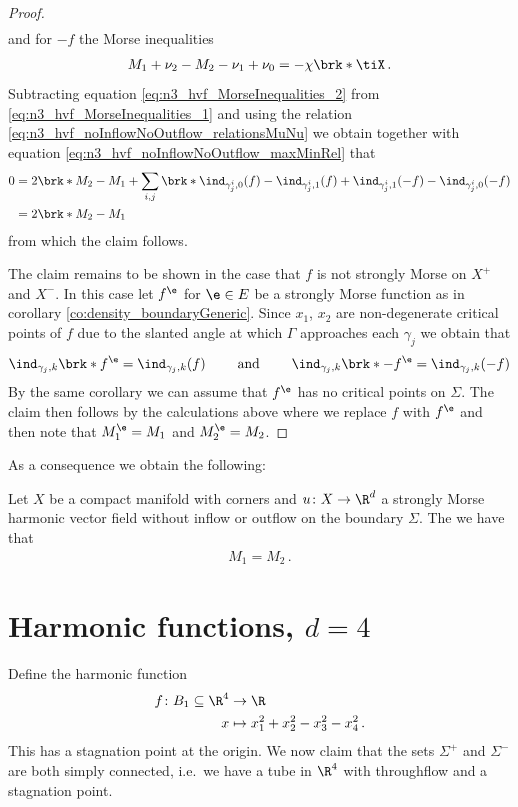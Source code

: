 \begin{proof}
\begin{align}
  \end{align}
  and for $-f$ the Morse inequalities
  \begin{align}
    M_1+\nu_2-M_2-\nu_1+\nu_0=-\chi\brk*{\tiX} \label{eq:n3_hvf_MorseInequalities_2}\,.
  \end{align}
  Subtracting equation \eqref{eq:n3_hvf_MorseInequalities_2} from \eqref{eq:n3_hvf_MorseInequalities_1} and using the relation
  \eqref{eq:n3_hvf_noInflowNoOutflow_relationsMuNu} we obtain
  together with equation \eqref{eq:n3_hvf_noInflowNoOutflow_maxMinRel} that
  \begin{align*}
    0&=2\brk*{M_2-M_1}
    +\sum_{i,j}\brk*{\ind_{\gamma_j^i,0}(f)
    -\ind_{\gamma_j^i,1}(f)
    +\ind_{\gamma_j^i,1}(-f)
    -\ind_{\gamma_j^i,0}(-f)} \\
    &=2\brk*{M_2-M_1}
  \end{align*}
  from which the claim follows.

  The claim remains to be shown in the case that $f$ is not strongly Morse on $X^+$ and $X^-$. In this case let
  $f^\e$ for $\e\in E$ be a strongly Morse function as in corollary \ref{co:density_boundaryGeneric}.
  Since $x_1$, $x_2$ are non-degenerate critical points of $f$
  due to the slanted angle at which
  $\Gamma$ approaches each $\gamma_j$
  we obtain that
  \begin{align}
    \ind_{\gamma_j,k}\brk*{f^\e}=\ind_{\gamma_j,k}(f)\qquad\text{ and }\qquad 
    \ind_{\gamma_j,k}\brk*{-f^\e}=\ind_{\gamma_j,k}(-f)
    \label{eq:n3_hvf_noInflowNoOutflow_morse_indexApprox}
  \end{align}
  By the same corollary we can assume that $f^\e$ has no critical points on
  $\Sigma$.
  The claim then follows by the calculations above where we replace
  $f$ with $f^\e$ and then note that $M_1^\e=M_1$ and $M_2^\e=M_2$.
\end{proof}

As a consequence we obtain the following:
\begin{corollary}
  Let $X$ be a compact manifold with corners and $u\colon X\to\R^d$ a strongly Morse harmonic vector field
  without inflow or outflow on the boundary $\Sigma$. The we have that
  \begin{align*}
    M_1=M_2\,.
  \end{align*}
\end{corollary}

\chapter{Harmonic functions, $d=4$} 
Define the harmonic function 
\begin{align*}
  f\colon B_1\subseteq\R^4&\to \R \\
  x &\mapsto x_1^2+x_2^2-x_3^2-x_4^2\,.
\end{align*}
This has a stagnation point at the origin. We now claim that the sets $\Sigma^+$ and $\Sigma^-$ are both simply connected, i.e.\
we have a tube in $\R^4$ with throughflow and a stagnation point.


